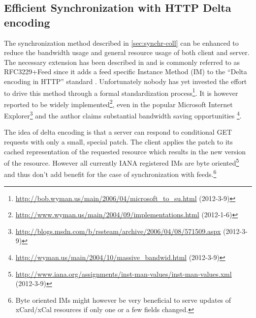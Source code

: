 \documentclass[11pt,a4paper,headsepline,twoside]{scrartcl}		%
\newcommand{\citeurl}[2]{\url{#1} (#2)}
\begin{document}





\subsection{Efficient Synchronization with HTTP Delta encoding}
\label{sec:effic-synchr-with}

The synchronization method described in \autoref{sec:synchr-coll} can be
enhanced to reduce the bandwidth usage and general resource usage of both client
and server. The necessary extension has been described in \cite{Wyman2004} and
is commonly referred to as RFC3229+Feed since it adds a feed specific Instance
Method (IM) to the ``Delta encoding in HTTP''
standard \cite{RFC3229}. Unfortunately nobody has yet invested the effort to
drive this method through a formal standardization
process\footnote{\citeurl{http://bob.wyman.us/main/2006/04/microsoft_to_su.html}{2012-3-9}}. It
is however reported to be widely
implemented\footnote{\citeurl{http://www.wyman.us/main/2004/09/implementations.html}{2012-1-6}},
even in the popular Microsoft Internet
Explorer\footnote{\citeurl{http://blogs.msdn.com/b/rssteam/archive/2006/04/08/571509.aspx}{2012-3-9}}
and the author claims substantial bandwidth saving opportunities
\footnote{\citeurl{http://wyman.us/main/2004/10/massive_bandwid.html}{2012-3-9}}.

The idea of delta encoding is that a server can respond to conditional GET
requests with only a small, special patch. The client applies the patch to its
cached representation of the requested resource which results in the new version
of the resource. However all currently IANA registered IMs are byte
oriented\footnote{\citeurl{http://www.iana.org/assignments/inst-man-values/inst-man-values.xml}{2012-3-9}}
and thus don't add benefit for the case of synchronization with
feeds.\footnote{Byte oriented IMs might however be very beneficial to serve
  updates of xCard/xCal resources if only one or a few fields changed.}
\end{document}
